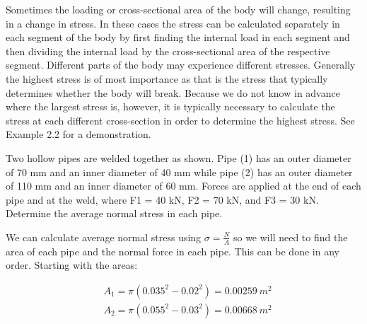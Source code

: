 \documentclass[
  letterpaper,
  DIV=11,
  numbers=noendperiod]{scrreprt}
\begin{document}
Sometimes the loading or cross-sectional area of the body will change,
resulting in a change in stress. In these cases the stress can be
calculated separately in each segment of the body by first finding the
internal load in each segment and then dividing the internal load by the
cross-sectional area of the respective segment. Different parts of the
body may experience different stresses. Generally the highest stress is
of most importance as that is the stress that typically determines
whether the body will break. Because we do not know in advance where the
largest stress is, however, it is typically necessary to calculate the
stress at each different cross-section in order to determine the highest
stress. See Example 2.2 for a demonstration.

\begin{tcolorbox}[enhanced jigsaw, breakable, opacityback=0, toptitle=1mm, left=2mm, colback=white, opacitybacktitle=0.6, colframe=quarto-callout-tip-color-frame, titlerule=0mm, arc=.35mm, leftrule=.75mm, bottomtitle=1mm, colbacktitle=quarto-callout-tip-color!10!white, rightrule=.15mm, title={Example 2.2}, bottomrule=.15mm, toprule=.15mm, coltitle=black]

Two hollow pipes are welded together as shown. Pipe (1) has an outer
diameter of 70 mm and an inner diameter of 40 mm while pipe (2) has an
outer diameter of 110 mm and an inner diameter of 60 mm. Forces are
applied at the end of each pipe and at the weld, where F1 = 40 kN, F2 =
70 kN, and F3 = 30 kN. Determine the average normal stress in each pipe.

\begin{tcolorbox}[enhanced jigsaw, breakable, opacityback=0, toptitle=1mm, left=2mm, colback=white, opacitybacktitle=0.6, colframe=quarto-callout-tip-color-frame, titlerule=0mm, arc=.35mm, leftrule=.75mm, bottomtitle=1mm, colbacktitle=quarto-callout-tip-color!10!white, rightrule=.15mm, title={Solution}, bottomrule=.15mm, toprule=.15mm, coltitle=black]

We can calculate average normal stress using \(\sigma=\frac{N}{A}\) so
we will need to find the area of each pipe and the normal force in each
pipe. This can be done in any order. Starting with the areas:

\[
\begin{aligned}
& A_1=\pi\left(0.035^2-0.02^2\right)=0.00259{~m}^2 \\
& A_2=\pi\left(0.055^2-0.03^2\right)=0.00668{~m}^2
\end{aligned}
\]


\end{tcolorbox}
\end{tcolorbox}
\end{document}
